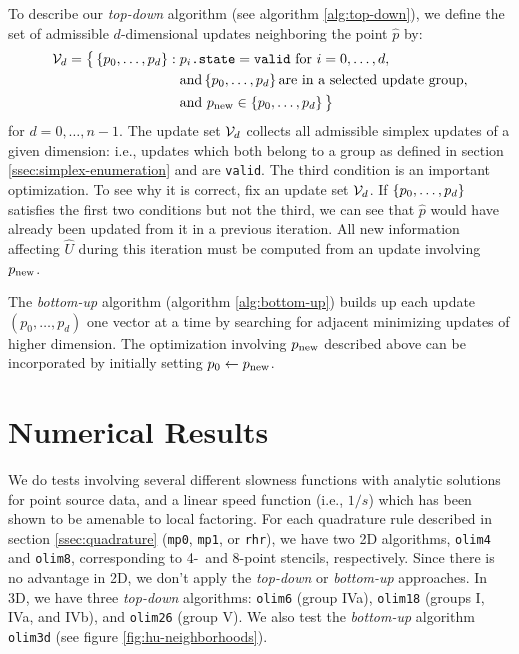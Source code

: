 \documentclass[smallcondensed]{svjour3}
\begin{document}
To describe our \emph{top-down} algorithm (see algorithm
\ref{alg:top-down}), we define the set of admissible $d$-dimensional
updates neighboring the point $\hat{p}$ by:
\begin{equation}\label{eq:calU}
  \begin{aligned}
    \mathcal{V}_d = \big\{\left\{p_0, \hdots, p_d\right\}: \; &p_i\texttt{.state}=\texttt{valid} \mbox{ for } i = 0, \hdots, d, \\
    &\mbox{and} \left\{p_0, \hdots, p_d\right\} \mbox{are in a selected update group}, \\
    &\mbox{and } p_{\operatorname{new}} \in \left\{p_0, \hdots, p_d\right\} \big\}
  \end{aligned}
\end{equation}
for $d = 0, \hdots, n - 1$. The update set $\mathcal{V}_d$ collects all
admissible simplex updates of a given dimension: i.e., updates which
both belong to a group as defined in section\@
\ref{ssec:simplex-enumeration} and are \texttt{valid}. The third
condition is an important optimization. To see why it is correct, fix
an update set $\mathcal{V}_d$. If $\left\{p_0, \hdots, p_d\right\}$ satisfies the
first two conditions but not the third, we can see that $\hat{p}$
would have already been updated from it in a previous iteration. All
new information affecting $\hat{U}$ during this iteration must be
computed from an update involving $p_{\operatorname{new}}$.

The \emph{bottom-up} algorithm (algorithm \ref{alg:bottom-up}) builds up each
update $(p_0, \hdots, p_d)$ one vector at a time by searching for
adjacent minimizing updates of higher dimension. The optimization
involving $p_{\operatorname{new}}$ described above can be incorporated by initially
setting $p_0 \gets p_{\operatorname{new}}$.

\section{Numerical Results}\label{sec:numerical-results}

We do tests involving several different slowness functions with
analytic solutions for point source data, and a linear speed function
(i.e., $1/s$) which has been shown to be amenable to local
factoring. For each quadrature rule described in section\@
\ref{ssec:quadrature} (\texttt{mp0}, \texttt{mp1}, or \texttt{rhr}),
we have two 2D algorithms, \texttt{olim4} and \texttt{olim8},
corresponding to 4-\ and 8-point stencils, respectively. Since there
is no advantage in 2D, we don't apply the \emph{top-down} or
\emph{bottom-up} approaches. In 3D, we have three \emph{top-down}
algorithms: \texttt{olim6} (group IVa), \texttt{olim18} (groups I,
IVa, and IVb), and \texttt{olim26} (group V). We also test the
\emph{bottom-up} algorithm \texttt{olim3d} (see figure
\ref{fig:hu-neighborhoods}).
\end{document}
